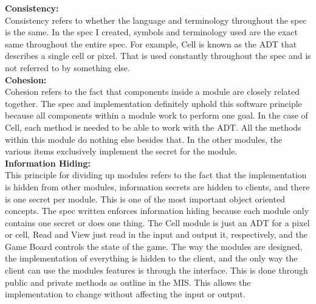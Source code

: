 \documentclass[12pt]{article}
\begin{document}
\noindent
\textbf{Consistency:} \\
Consistency refers to whether the language and terminology throughout the spec is the same. In the spec I created, symbols and terminology used are the exact same throughout the entire spec. For example, Cell is known as the ADT that describes a single cell or pixel. That is used constantly throughout the spec and is not referred to by something else.\\

\noindent
\textbf{Cohesion:} \\
Cohesion refers to the fact that components inside a module are closely related together. The spec and implementation definitely uphold this software principle because all components within a module work to perform one goal. In the case of Cell, each method is needed to be able to work with the ADT. All the methods within this module do nothing else besides that. In the other modules, the various items exclusively implement the secret for the module.\\

\noindent
\textbf{Information Hiding:} \\
This principle for dividing up modules refers to the fact that the implementation is hidden from other modules, information secrets are hidden to clients, and there is one secret per module. This is one of the most important object oriented concepts. The spec written enforces information hiding because each module only contains one secret or does one thing. The Cell module is just an ADT for a pixel or cell, Read and View just read in the input and output it, respectively, and the Game Board controls the state of the game. The way the modules are designed, the implementation of everything is hidden to the client, and the only way the client can use the modules features is through the interface. This is done through public and private methods as outline in the MIS. This allows the implementation to change without affecting the input or output. \\
\end{document}
